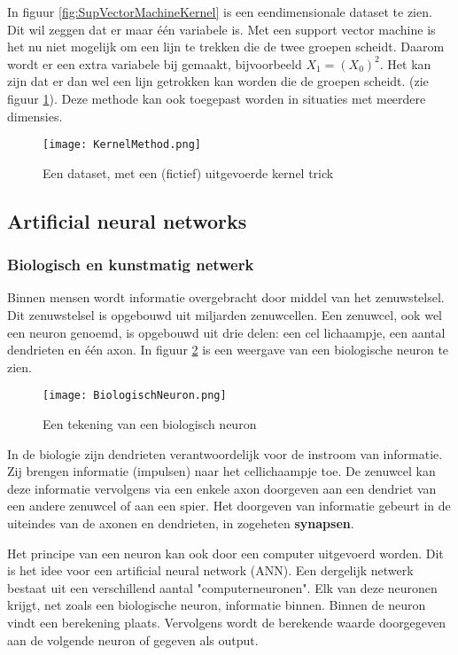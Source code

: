 In figuur \ref{fig:SupVectorMachineKernel} is een eendimensionale dataset te zien. Dit wil zeggen dat er maar \'{e}\'{e}n variabele is. Met een support vector machine is het nu niet mogelijk om een lijn te trekken die de twee groepen scheidt. Daarom wordt er een extra variabele bij gemaakt, bijvoorbeeld $X_{1} = (X_{0})^{2}$. Het kan zijn dat er dan wel een lijn getrokken kan worden die de groepen scheidt. (zie figuur \ref{fig:SupVectorMachine2}). Deze methode kan ook toegepast worden in situaties met meerdere dimensies.

\begin{figure}[H]
  \centering
    \texttt{[image: KernelMethod.png]}
  \caption{Een dataset, met een (fictief) uitgevoerde kernel trick}
  \label{fig:SupVectorMachine2}
\end{figure}


\subsection{Artificial neural networks}
\label{fig:ArtificialNeuralNetworks}

\subsubsection{Biologisch en kunstmatig netwerk}
Binnen mensen wordt informatie overgebracht door middel van het zenuwstelsel. Dit zenuwstelsel is opgebouwd uit miljarden zenuwcellen. Een zenuwcel, ook wel een neuron genoemd, is opgebouwd uit drie delen: een cel lichaampje, een aantal dendrieten en \'{e}\'{e}n axon. In figuur \ref{fig:BiologischNeuron} is een weergave van een biologische neuron te zien.

\begin{figure}[H]
  \centering
    \texttt{[image: BiologischNeuron.png]}
  \caption{Een tekening van een biologisch neuron}
  \label{fig:BiologischNeuron}
\end{figure}

In de biologie zijn dendrieten verantwoordelijk voor de instroom van informatie. Zij brengen informatie (impulsen) naar het cellichaampje toe. De zenuwcel kan deze informatie vervolgens via een enkele axon doorgeven aan een dendriet van een andere zenuwcel of aan een spier. Het doorgeven van informatie gebeurt in de uiteindes van de axonen en dendrieten, in zogeheten \textbf{synapsen}.

Het principe van een neuron kan ook door een computer uitgevoerd worden. Dit is het idee voor een artificial neural network (ANN). Een dergelijk netwerk bestaat uit een verschillend aantal "computerneuronen". Elk van deze neuronen krijgt, net zoals een biologische neuron, informatie binnen. Binnen de neuron vindt een berekening plaats. Vervolgens wordt de berekende waarde doorgegeven aan de volgende neuron of gegeven als output.

